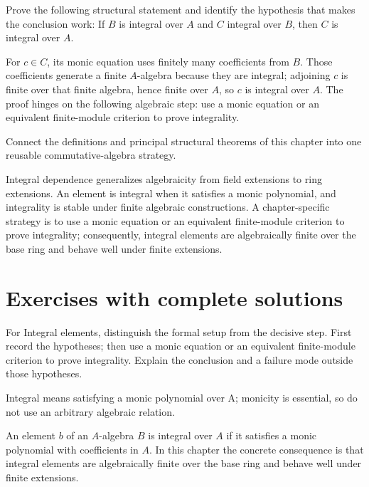 \begin{problem}\label{prob:v19-problem-11}
Prove the following structural statement and identify the hypothesis that makes the conclusion work: If $B$ is integral over $A$ and $C$ integral over $B$, then $C$ is integral over $A$.
\end{problem}
\begin{solution}
For $c\in C$, its monic equation uses finitely many coefficients from $B$. Those coefficients generate a finite $A$-algebra because they are integral; adjoining $c$ is finite over that finite algebra, hence finite over $A$, so $c$ is integral over $A$. The proof hinges on the following algebraic step: use a monic equation or an equivalent finite-module criterion to prove integrality.
\end{solution}

\begin{problem}\label{prob:v19-problem-12}
Connect the definitions and principal structural theorems of this chapter into one reusable commutative-algebra strategy.
\end{problem}
\begin{solution}
Integral dependence generalizes algebraicity from field extensions to ring extensions. An element is integral when it satisfies a monic polynomial, and integrality is stable under finite algebraic constructions. A chapter-specific strategy is to use a monic equation or an equivalent finite-module criterion to prove integrality; consequently, integral elements are algebraically finite over the base ring and behave well under finite extensions.
\end{solution}

\section{Exercises with complete solutions}

\begin{exercise}\label{exr:v19-01}
For Integral elements, distinguish the formal setup from the decisive step. First record the hypotheses; then use a monic equation or an equivalent finite-module criterion to prove integrality. Explain the conclusion and a failure mode outside those hypotheses.
\end{exercise}
\begin{hint}
Integral means satisfying a monic polynomial over A; monicity is essential, so do not use an arbitrary algebraic relation.
\end{hint}
\begin{solution}
An element $b$ of an $A$-algebra $B$ is integral over $A$ if it satisfies a monic polynomial with coefficients in $A$. In this chapter the concrete consequence is that integral elements are algebraically finite over the base ring and behave well under finite extensions.
\end{solution}

